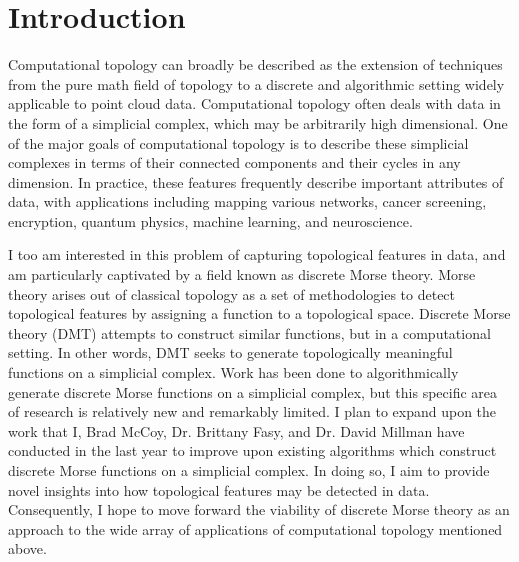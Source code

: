 \documentclass[11pt]{article}
\begin{document}
\maketitle


\section{Introduction}

Computational topology can broadly be described as the extension of techniques
from the pure math field of topology to a discrete and algorithmic setting
widely applicable to point cloud data. Computational topology often deals with data
in the form of a simplicial complex, which may be arbitrarily high dimensional.
One of the major goals of computational topology is to describe these simplicial
complexes in terms of their connected components and their cycles in any dimension.
In practice, these features frequently describe important attributes of data, with
applications including mapping various networks, cancer screening,
encryption, quantum physics, machine learning, and neuroscience.

I too am interested in this problem of capturing topological features in data,
and am particularly captivated by a field known as discrete Morse theory.
Morse theory arises out of classical topology as a set of
methodologies to detect topological features by assigning a function to a topological
space. Discrete Morse theory (DMT) attempts to construct similar functions, but in a computational
setting. In other words, DMT seeks to generate topologically meaningful functions on a simplicial
complex. Work has been done to algorithmically generate discrete Morse functions on a simplicial complex, 
but this specific area of research is relatively new and remarkably limited. I plan to expand upon
the work that I, Brad McCoy, Dr. Brittany Fasy, and Dr. David Millman have conducted in the last year
to improve upon existing algorithms which construct discrete Morse functions on a simplicial complex.
In doing so, I aim to provide novel insights into how topological features may be detected in data.
Consequently, I hope to move forward the viability of discrete Morse theory as an approach to the 
wide array of applications of computational topology mentioned above.
\end{document}
